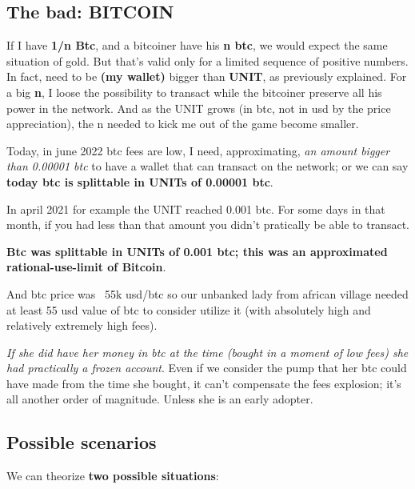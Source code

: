 \documentclass{article}
\begin{document}
\subsection{The bad: BITCOIN}


If I have \textbf{1/n Btc}, and a bitcoiner have his \textbf{n btc}, we would expect the same situation of gold. But that's valid only for a limited sequence of positive numbers. In fact, need to be \textbf{(my wallet)} bigger than \textbf{UNIT}, as previously explained. For a big \textbf{n}, I loose the possibility to transact while the bitcoiner preserve all his power in the network. And as the UNIT grows (in btc, not in usd by the price appreciation), the n needed to kick me out of the game become smaller.


Today, in june 2022 btc fees are low, I need, approximating, \emph{an amount bigger than 0.00001 btc} to have a wallet that can transact on the network; or we can say \textbf{today btc is splittable in UNITs of 0.00001 btc}.


In april 2021 for example the UNIT reached 0.001 btc. For some days in that month, if you had less than that amount you didn't pratically be able to transact.\vspace{0.2cm}



\textbf{Btc was splittable in UNITs of 0.001 btc; this was an approximated rational-use-limit of Bitcoin}.\vspace{0.2cm}


And btc price was ~55k usd/btc so our unbanked lady from african village needed at least 55 usd value of btc to consider utilize it (with absolutely high and relatively extremely high fees).\vspace{0.3cm}


\emph{If she did have her money in btc at the time (bought in a moment of low fees) she had practically a frozen account}. Even if we consider the pump that her btc could have made from the time she bought, it can't compensate the fees explosion; it's all another order of magnitude. Unless she is an early adopter.\vspace{0.5cm}


\subsection{Possible scenarios}


We can theorize \textbf{two possible situations}:\vspace{0.2cm}
\end{document}
